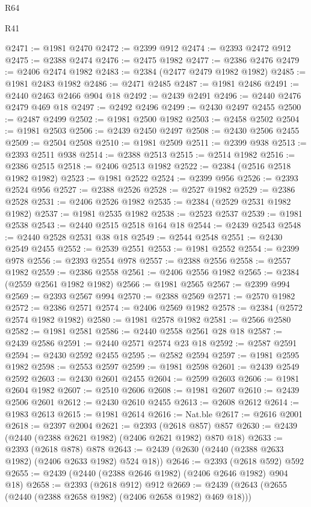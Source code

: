 \begin{lexlean}{R64}
\begin{lexlean}{R41}
\begin{coremodule}
{{{{{{{{{{{{{{{{{{{{{{{{{{{{{{{{{{{{{{{{{{{{{{{{{{{{{{{{{{{{{{{{{{{{{{{{{{{{{{{{{{{{{{{{{@2471 := @1981 @2470
@2472 := @2399 @912
@2474 := @2393 @2472 @912
@2475 := @2388 @2474
@2476 := @2475 @1982
@2477 := @2386 @2476
@2479 := @2406 @2474 @1982
@2483 := @2384 (@2477 @2479 @1982 @1982)
@2485 := @1981 @2483 @1982
@2486 := @2471 @2485
@2487 := @1981 @2486
@2491 := @2440 @2463 @2466 @904 @18
@2492 := @2439 @2491
@2496 := @2440 @2476 @2479 @469 @18
@2497 := @2492 @2496
@2499 := @2430 @2497 @2455
@2500 := @2487 @2499
@2502 := @1981 @2500 @1982
@2503 := @2458 @2502
@2504 := @1981 @2503
@2506 := @2439 @2450 @2497
@2508 := @2430 @2506 @2455
@2509 := @2504 @2508
@2510 := @1981 @2509
@2511 := @2399 @938
@2513 := @2393 @2511 @938
@2514 := @2388 @2513
@2515 := @2514 @1982
@2516 := @2386 @2515
@2518 := @2406 @2513 @1982
@2522 := @2384 (@2516 @2518 @1982 @1982)
@2523 := @1981 @2522
@2524 := @2399 @956
@2526 := @2393 @2524 @956
@2527 := @2388 @2526
@2528 := @2527 @1982
@2529 := @2386 @2528
@2531 := @2406 @2526 @1982
@2535 := @2384 (@2529 @2531 @1982 @1982)
@2537 := @1981 @2535 @1982
@2538 := @2523 @2537
@2539 := @1981 @2538
@2543 := @2440 @2515 @2518 @164 @18
@2544 := @2439 @2543
@2548 := @2440 @2528 @2531 @38 @18
@2549 := @2544 @2548
@2551 := @2430 @2549 @2455
@2552 := @2539 @2551
@2553 := @1981 @2552
@2554 := @2399 @978
@2556 := @2393 @2554 @978
@2557 := @2388 @2556
@2558 := @2557 @1982
@2559 := @2386 @2558
@2561 := @2406 @2556 @1982
@2565 := @2384 (@2559 @2561 @1982 @1982)
@2566 := @1981 @2565
@2567 := @2399 @994
@2569 := @2393 @2567 @994
@2570 := @2388 @2569
@2571 := @2570 @1982
@2572 := @2386 @2571
@2574 := @2406 @2569 @1982
@2578 := @2384 (@2572 @2574 @1982 @1982)
@2580 := @1981 @2578 @1982
@2581 := @2566 @2580
@2582 := @1981 @2581
@2586 := @2440 @2558 @2561 @28 @18
@2587 := @2439 @2586
@2591 := @2440 @2571 @2574 @23 @18
@2592 := @2587 @2591
@2594 := @2430 @2592 @2455
@2595 := @2582 @2594
@2597 := @1981 @2595 @1982
@2598 := @2553 @2597
@2599 := @1981 @2598
@2601 := @2439 @2549 @2592
@2603 := @2430 @2601 @2455
@2604 := @2599 @2603
@2606 := @1981 @2604 @1982
@2607 := @2510 @2606
@2608 := @1981 @2607
@2610 := @2439 @2506 @2601
@2612 := @2430 @2610 @2455
@2613 := @2608 @2612
@2614 := @1983 @2613
@2615 := @1981 @2614
@2616 := Nat.ble
@2617 := @2616 @2001
@2618 := @2397 @2004
@2621 := @2393 (@2618 @857) @857
@2630 := @2439 (@2440 (@2388 @2621 @1982) (@2406 @2621 @1982) @870 @18)
@2633 := @2393 (@2618 @878) @878
@2643 := @2439 (@2630 (@2440 (@2388 @2633 @1982) (@2406 @2633 @1982) @524 @18))
@2646 := @2393 (@2618 @592) @592
@2655 := @2439 (@2440 (@2388 @2646 @1982) (@2406 @2646 @1982) @904 @18)
@2658 := @2393 (@2618 @912) @912
@2669 := @2439 (@2643 (@2655 (@2440 (@2388 @2658 @1982) (@2406 @2658 @1982) @469 @18)))
}}}}}}}}}}}}}}}}}}}}}}}}}}}}}}}}}}}}}}}}}}}}}}}}}}}}}}}}}}}}}}}}}}}}}}}}}}}}}}}}}}}}}}}}}
\end{coremodule}
\end{lexlean}
\end{lexlean}
